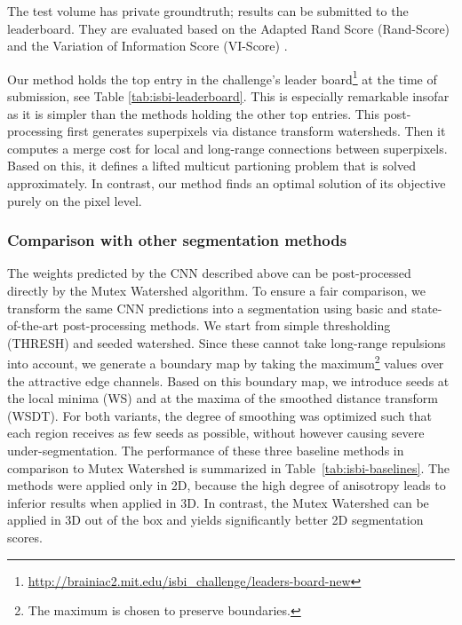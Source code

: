 The test volume has private groundtruth; results can be submitted to the leaderboard.
They are evaluated based on the Adapted Rand Score (Rand-Score) and the Variation of Information Score (VI-Score) \cite{isbi2012challenge}.%

Our method holds the top entry in the challenge's leader board\footnote{{\href{url}{http://brainiac2.mit.edu/isbi\_challenge/leaders-board-new}}} at the time of submission, see Table \ref{tab:isbi-leaderboard}.
This is especially remarkable insofar as it is simpler than the methods holding the other 
top entries.  
This post-processing first generates superpixels via distance transform watersheds.
Then it computes a merge cost for local and long-range connections between superpixels.
Based on this, it defines a lifted multicut partioning problem that is solved approximately.
In contrast, our method finds an optimal solution of its objective purely on the pixel level.

\subsubsection*{Comparison with other segmentation methods}
The weights predicted by the CNN described above can be post-processed directly by the Mutex Watershed algorithm. To ensure a fair comparison, we transform the same CNN predictions into a segmentation using basic and state-of-the-art post-processing methods. 
We start from simple thresholding (THRESH) and seeded watershed. Since these cannot take long-range repulsions into account, we generate a boundary map by taking the maximum\footnote{The maximum is chosen to preserve boundaries.} values over the attractive edge channels. Based on this boundary map, we introduce seeds at the local minima (WS) and at the maxima of the smoothed distance transform (WSDT). For both variants, the degree of smoothing was optimized such that each region receives as few seeds as possible, without however causing severe under-segmentation. The performance of these three baseline methods in comparison to Mutex Watershed is summarized in Table~\ref{tab:isbi-baselines}. The methods were applied only in 2D, because the
high degree of anisotropy leads to inferior results when applied in 3D.
In contrast, the Mutex Watershed can be applied in 3D out of the box and yields significantly better
2D segmentation scores.

